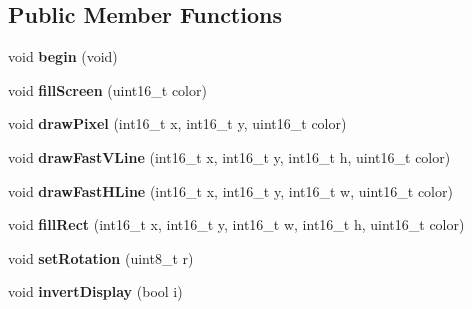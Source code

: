 \subsection*{Public Member Functions}
\begin{DoxyCompactItemize}
\item 
\hypertarget{class_adafruit___i_l_i9341_ac888d6593f1e3bad4d2b22b4e159616e}{}void {\bfseries begin} (void)\label{class_adafruit___i_l_i9341_ac888d6593f1e3bad4d2b22b4e159616e}

\item 
\hypertarget{class_adafruit___i_l_i9341_a8ddbebf26c29ac4ae9dcba5f245bcf22}{}void {\bfseries fill\+Screen} (uint16\+\_\+t color)\label{class_adafruit___i_l_i9341_a8ddbebf26c29ac4ae9dcba5f245bcf22}

\item 
\hypertarget{class_adafruit___i_l_i9341_a05e026d2694e464ec40ea4c41b2156a3}{}void {\bfseries draw\+Pixel} (int16\+\_\+t x, int16\+\_\+t y, uint16\+\_\+t color)\label{class_adafruit___i_l_i9341_a05e026d2694e464ec40ea4c41b2156a3}

\item 
\hypertarget{class_adafruit___i_l_i9341_abad7dca69da48516407451326210b89b}{}void {\bfseries draw\+Fast\+V\+Line} (int16\+\_\+t x, int16\+\_\+t y, int16\+\_\+t h, uint16\+\_\+t color)\label{class_adafruit___i_l_i9341_abad7dca69da48516407451326210b89b}

\item 
\hypertarget{class_adafruit___i_l_i9341_a183d65bf81c6e6b02daa256cf85cd875}{}void {\bfseries draw\+Fast\+H\+Line} (int16\+\_\+t x, int16\+\_\+t y, int16\+\_\+t w, uint16\+\_\+t color)\label{class_adafruit___i_l_i9341_a183d65bf81c6e6b02daa256cf85cd875}

\item 
\hypertarget{class_adafruit___i_l_i9341_ac9dad828fc0ac895ec857c83d79da5eb}{}void {\bfseries fill\+Rect} (int16\+\_\+t x, int16\+\_\+t y, int16\+\_\+t w, int16\+\_\+t h, uint16\+\_\+t color)\label{class_adafruit___i_l_i9341_ac9dad828fc0ac895ec857c83d79da5eb}

\item 
\hypertarget{class_adafruit___i_l_i9341_ae82ff4003dba45826284ff16791a647c}{}void {\bfseries set\+Rotation} (uint8\+\_\+t r)\label{class_adafruit___i_l_i9341_ae82ff4003dba45826284ff16791a647c}

\item 
\hypertarget{class_adafruit___i_l_i9341_aeebe7e19bba4eea54f72223af0b580c2}{}void {\bfseries invert\+Display} (bool i)\label{class_adafruit___i_l_i9341_aeebe7e19bba4eea54f72223af0b580c2}


\end{DoxyCompactItemize}
